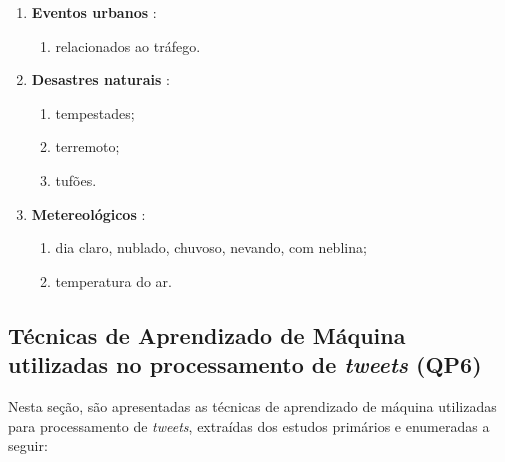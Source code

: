 \documentclass[
	12pt,				%
	oneside,			%
	a4paper,			%
	english,			%
	brazil				%
	]{abntex2ppgsi}
\begin{document}
{{{\begin{enumerate}
\item \textbf{Eventos urbanos} \cite{Chen2016, Lecue2014}:
\begin{enumerate}
\item relacionados ao tráfego.
\end{enumerate}

\item \textbf{Desastres naturais} \cite{Itoh2016}:
\begin{enumerate}
\item tempestades;
\item terremoto;
\item tufões.
\end{enumerate}

\item \textbf{Metereológicos} \cite{Chen2016}:
\begin{enumerate}
\item dia claro, nublado, chuvoso, nevando, com neblina;
\item temperatura do ar.
\end{enumerate}

\end{enumerate}

\subsection{Técnicas de Aprendizado de Máquina utilizadas no processamento de \textit{tweets} (QP6)}
\label{iaClassification}
Nesta seção, são apresentadas as técnicas de aprendizado de máquina utilizadas para processamento de \textit{tweets}, extraídas dos estudos primários e enumeradas a seguir:

}}}
\end{document}
